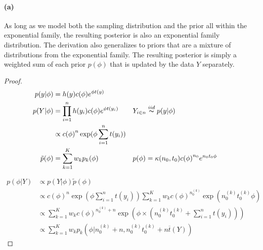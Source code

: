 \documentclass[11pt, letterpaper]{article}
\begin{document}
\paragraph{(a)}
As long as we model both the sampling distribution and the prior all within the exponential family, the resulting
posterior is also an exponential family distribution. The derivation also generalizes to priors that are
a mixture of distributions from the exponential family. The resulting posterior is simply a weighted sum
of each prior $p(\phi)$ that is updated by the data $Y$ separately.
\begin{proof}
\begin{align*}
  p(y|\phi) &= h(y)c(\phi)e^{\phi t(y)} \\
  p(Y|\phi) &= \prod_{i=1}^{n} h(y_i)c(\phi)e^{\phi t(y_i)} && Y_{i \in n} \overset{iid}{\thicksim} p(y|\phi) \\
    &\propto {c(\phi)}^{n} \exp(\phi \sum_{i=1}^{n} t(y_i)) \\
  \tilde{p}(\phi) &= \sum_{k=1}^{K} w_k p_k(\phi) && p(\phi) = \kappa(n_0, t_0) {c(\phi)}^{n_0} e^{n_0 t_0 \phi}
\end{align*}

\begin{align*}
  p(\phi|Y) &\propto p(Y|\phi)\tilde{p}(\phi) \\
    &\propto {c(\phi)}^{n} \exp(\phi \sum_{i=1}^{n} t(y_i)) \sum_{k=1}^{K} w_k {c(\phi)}^{n_0^{(k)}} \exp(n_0^{(k)} t_0^{(k)} \phi) \\
    &\propto \sum_{k=1}^{K} w_k {c(\phi)}^{n_0^{(k)} + n} \exp(\phi \times (n_0^{(k)} t_0^{(k)} + \sum_{i=1}^{n} t(y_i))) \\
    &\propto \sum_{k=1}^{K} w_k p_k(\phi | n_0^{(k)}+n, n_0^{(k)} t_0^{(k)} + n \overline{t}(Y))
\end{align*}
\end{proof}
\end{document}

